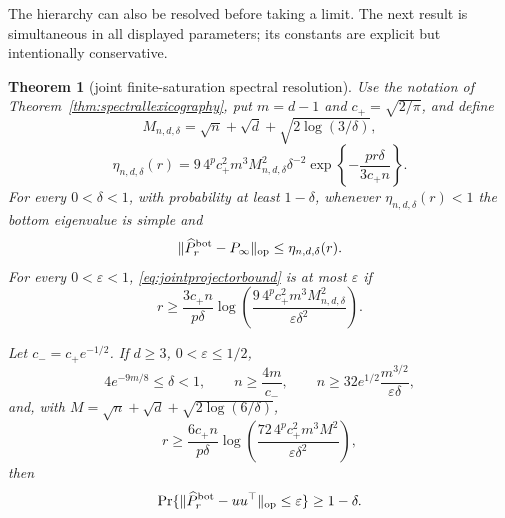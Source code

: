 \documentclass[11pt]{article}
\newtheorem{theorem}{Theorem}[section]
\begin{document}
The hierarchy can also be resolved before taking a limit.  The next result is simultaneous in all displayed
parameters; its constants are explicit but intentionally conservative.

\begin{theorem}[joint finite-saturation spectral resolution]
\label{thm:jointspectralresolution}
Use the notation of Theorem~\ref{thm:spectrallexicography}, put $m=d-1$ and $c_+=\sqrt{2/\pi}$, and define
\[
 M_{n,d,\delta}=\sqrt n+\sqrt d+\sqrt{2\log(3/\delta)},
\]
\begin{equation}
 \eta_{n,d,\delta}(r)=
 9\,4^pc_+^2m^3M_{n,d,\delta}^2\delta^{-2}
 \exp\!\left\{-\frac{pr\delta}{3c_+n}\right\}.
 \label{eq:jointeta}
\end{equation}
For every $0<\delta<1$, with probability at least $1-\delta$, whenever
$\eta_{n,d,\delta}(r)<1$ the bottom eigenvalue is simple and
\begin{equation}
 \lVert\widehat P_r^{\rm bot}-P_\infty\rVert_{\rm op}
 \le\eta_{n,d,\delta}(r).
 \label{eq:jointprojectorbound}
\end{equation}
For every $0<\varepsilon<1$, \eqref{eq:jointprojectorbound} is at most $\varepsilon$ if
\begin{equation}
 r\ge\frac{3c_+n}{p\delta}
 \log\!\left(\frac{9\,4^pc_+^2m^3M_{n,d,\delta}^2}{\varepsilon\delta^2}\right).
 \label{eq:jointprojectorthreshold}
\end{equation}

Let $c_-=c_+e^{-1/2}$.  If $d\ge3$, $0<\varepsilon\le1/2$,
\[
 4e^{-9m/8}\le\delta<1,\qquad n\ge\frac{4m}{c_-},\qquad
 n\ge32e^{1/2}\frac{m^{3/2}}{\varepsilon\delta},
\]
and, with $M=\sqrt n+\sqrt d+\sqrt{2\log(6/\delta)}$,
\begin{equation}
 r\ge\frac{6c_+n}{p\delta}
 \log\!\left(\frac{72\,4^pc_+^2m^3M^2}{\varepsilon\delta^2}\right),
 \label{eq:jointteacherthreshold}
\end{equation}
then
\begin{equation}
 \Pr\{\lVert\widehat P_r^{\rm bot}-uu^\top\rVert_{\rm op}\le\varepsilon\}
 \ge1-\delta.
 \label{eq:jointteacherguarantee}
\end{equation}
\end{theorem}
\end{document}
